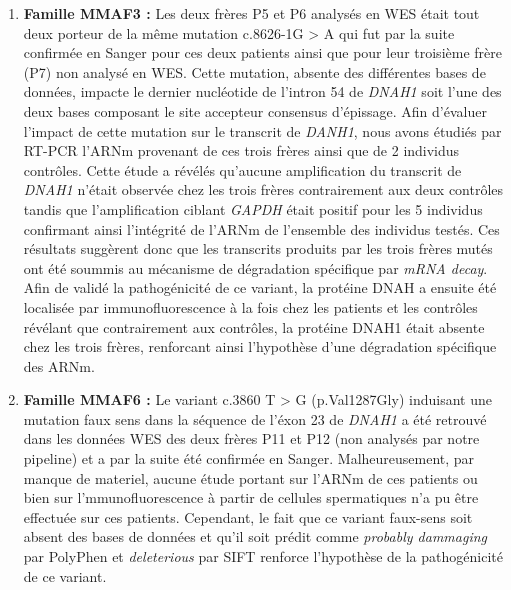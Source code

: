 \documentclass[12pt,twoside]{reedthesis}
\theoremstyle{definition}
\theoremstyle{definition}
\theoremstyle{remark}
\begin{document}
  \begin{enumerate}
  \def\labelenumi{\arabic{enumi}.}
  \item
    \textbf{Famille MMAF3 :} Les deux frères P5 et P6 analysés en WES
    était tout deux porteur de la même mutation c.8626-1G \textgreater{} A
    qui fut par la suite confirmée en Sanger pour ces deux patients ainsi
    que pour leur troisième frère (P7) non analysé en WES. Cette mutation,
    absente des différentes bases de données, impacte le dernier
    nucléotide de l'intron 54 de \emph{DNAH1} soit l'une des deux bases
    composant le site accepteur consensus d'épissage. Afin d'évaluer
    l'impact de cette mutation sur le transcrit de \emph{DANH1}, nous
    avons étudiés par RT-PCR l'ARNm provenant de ces trois frères ainsi
    que de 2 individus contrôles. Cette étude a révélés qu'aucune
    amplification du transcrit de \emph{DNAH1} n'était observée chez les
    trois frères contrairement aux deux contrôles tandis que
    l'amplification ciblant \emph{GAPDH} était positif pour les 5
    individus confirmant ainsi l'intégrité de l'ARNm de l'ensemble des
    individus testés. Ces résultats suggèrent donc que les transcrits
    produits par les trois frères mutés ont été soummis au mécanisme de
    dégradation spécifique par \emph{mRNA decay}. Afin de validé la
    pathogénicité de ce variant, la protéine DNAH a ensuite été localisée
    par immunofluorescence à la fois chez les patients et les contrôles
    révélant que contrairement aux contrôles, la protéine DNAH1 était
    absente chez les trois frères, renforcant ainsi l'hypothèse d'une
    dégradation spécifique des ARNm.
  \item
    \textbf{Famille MMAF6 :} Le variant c.3860 T \textgreater{} G
    (p.Val1287Gly) induisant une mutation faux sens dans la séquence de
    l'éxon 23 de \emph{DNAH1} a été retrouvé dans les données WES des deux
    frères P11 et P12 (non analysés par notre pipeline) et a par la suite
    été confirmée en Sanger. Malheureusement, par manque de materiel,
    aucune étude portant sur l'ARNm de ces patients ou bien sur
    l'mmunofluorescence à partir de cellules spermatiques n'a pu être
    effectuée sur ces patients. Cependant, le fait que ce variant
    faux-sens soit absent des bases de données et qu'il soit prédit comme
    \emph{probably dammaging} par PolyPhen et \emph{deleterious} par SIFT
    renforce l'hypothèse de la pathogénicité de ce variant.
  \end{enumerate}
  
\end{document}
